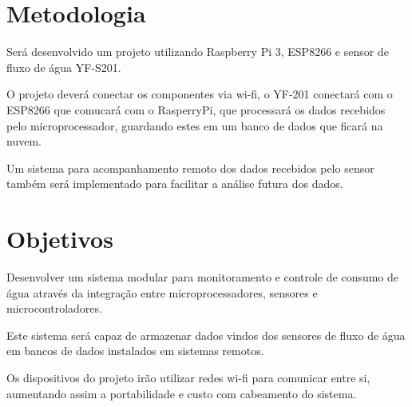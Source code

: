 \section{Metodologia}

Será desenvolvido um projeto utilizando Raspberry Pi 3, ESP8266 e sensor de fluxo de água YF-S201.

O projeto deverá conectar os componentes via wi-fi, o YF-201 conectará com o ESP8266 que comucará com o RasperryPi, que processará os dados recebidos pelo microprocessador, guardando estes em um banco de dados que ficará na nuvem.

Um sistema para acompanhamento remoto dos dados recebidos pelo sensor também será implementado para facilitar a análise futura dos dados.

\section{Objetivos}

Desenvolver um sistema modular para monitoramento e controle de consumo de água através da integração entre microprocessadores, sensores e microcontroladores.

Este sistema será capaz de armazenar dados vindos dos sensores de fluxo de água em bancos de dados instalados em sistemas remotos.

Os dispositivos do projeto irão utilizar redes wi-fi para comunicar entre si, aumentando assim a portabilidade e custo com cabeamento do sistema.